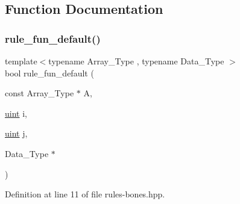 \subsection{Function Documentation}
\mbox{\label{rules-bones_8hpp_a1afd3e20386fc5b8d5ad45047c875375}} 
\subsubsection{\texorpdfstring{rule\+\_\+fun\+\_\+default()}{rule\_fun\_default()}}
{\footnotesize\ttfamily template$<$typename Array\+\_\+\+Type , typename Data\+\_\+\+Type $>$ \\
bool rule\+\_\+fun\+\_\+default (\begin{DoxyParamCaption}\item[{const Array\+\_\+\+Type $\ast$}]{A,  }\item[{\hyperlink{typedefs_8hpp_a91ad9478d81a7aaf2593e8d9c3d06a14}{uint}}]{i,  }\item[{\hyperlink{typedefs_8hpp_a91ad9478d81a7aaf2593e8d9c3d06a14}{uint}}]{j,  }\item[{Data\+\_\+\+Type $\ast$}]{ }\end{DoxyParamCaption})\hspace{0.3cm}{\ttfamily [inline]}}



Definition at line 11 of file rules-\/bones.\+hpp.

